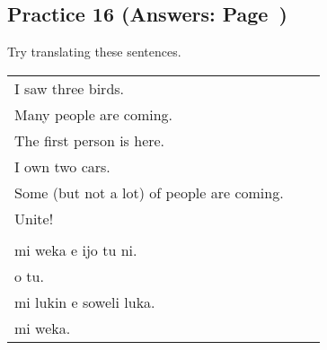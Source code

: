 \subsection*{Practice 16 (Answers: Page~\pageref{'numbers'})}
%
Try translating these sentences.

\begin{supertabular}{p{5,5cm}|ll}
   I saw three birds.    \\ %
   Many people are coming. \\   %
   The first person is here. \\   %
   I own two cars.   \\ %
   Some (but not a lot) of people are coming. \\  %
   Unite!    \\ %
 && \\ %
   mi weka e ijo tu ni.   \\ %
   o tu.   \\ %
   mi lukin e soweli luka. \\   %
   mi weka.   \\ %
\end{supertabular}
